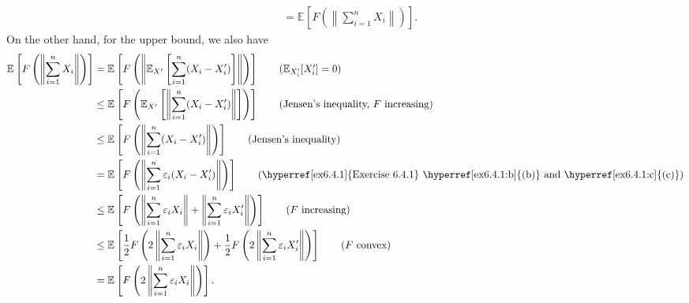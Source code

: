 \begin{answer}
\begin{align*}
		 & = \mathbb{E}_{}\left[F \left( \left\lVert \sum_{i=1}^{n} X_i \right\rVert \right) \right].
	\end{align*}
	On the other hand, for the upper bound, we also have
	\begin{align*}
		\mathbb{E}_{}\left[F \left( \left\lVert \sum_{i=1}^{n} X_i \right\rVert \right) \right]
		 & = \mathbb{E}_{}\left[F \left( \left\lVert \mathbb{E}_{X^{\prime} }\left[ \sum_{i=1}^{n} (X_i - X_i^{\prime} ) \right] \right\rVert \right) \right] \tag*{(\(\mathbb{E}_{X^{\prime}_i }[X_i^{\prime} ] = 0 \))}                                      \\
		 & \leq \mathbb{E}_{}\left[F \left( \mathbb{E}_{X^{\prime} }\left[ \left\lVert \sum_{i=1}^{n} (X_i - X_i^{\prime} ) \right\rVert \right] \right) \right] \tag*{(Jensen's inequality, \(F\) increasing)}                                                \\
		 & \leq \mathbb{E}_{}\left[F \left( \left\lVert \sum_{i=1}^{n} (X_i - X_i^{\prime} ) \right\rVert \right) \right] \tag*{(Jensen's inequality)}                                                                                                         \\
		 & = \mathbb{E}_{}\left[F \left( \left\lVert \sum_{i=1}^{n} \varepsilon _i (X_i - X_i^{\prime} ) \right\rVert \right) \right] \tag*{(\hyperref[ex6.4.1]{Exercise 6.4.1} \hyperref[ex6.4.1:b]{(b)} and \hyperref[ex6.4.1:c]{(c)})}                      \\
		 & \leq \mathbb{E}_{}\left[F \left( \left\lVert \sum_{i=1}^{n} \varepsilon _i X_i \right\rVert + \left\lVert \sum_{i=1}^{n} \varepsilon _i X_i^{\prime} \right\rVert \right) \right] \tag*{(\(F\) increasing)}                                         \\
		 & \leq \mathbb{E}_{}\left[\frac{1}{2} F \left( 2 \left\lVert \sum_{i=1}^{n} \varepsilon _i X_i \right\rVert \right) + \frac{1}{2} F\left( 2 \left\lVert \sum_{i=1}^{n} \varepsilon _i X_i^{\prime} \right\rVert \right) \right] \tag*{(\(F\) convex)} \\
		 & = \mathbb{E}_{}\left[F \left( 2 \left\lVert \sum_{i=1}^{n} \varepsilon _i X_i \right\rVert \right) \right].
	\end{align*}
\end{answer}

